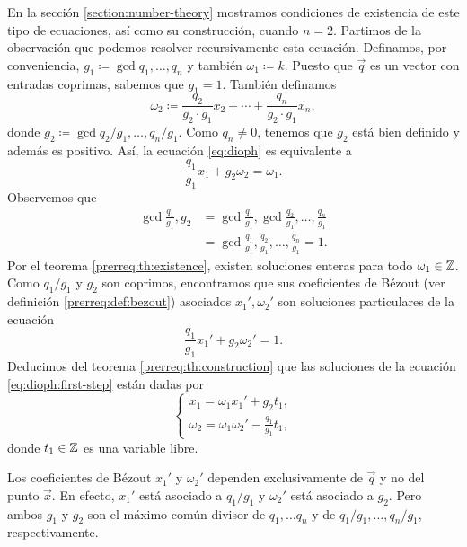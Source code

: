 En la sección \ref{section:number-theory} mostramos condiciones de existencia
de este tipo de ecuaciones, así como su construcción, cuando $n = 2$. Partimos de la
observación que podemos resolver recursivamente esta ecuación. Definamos, por conveniencia, $g_1
\coloneq \gcd{q_1, \ldots, q_n}$ y también $\omega_1 \coloneq k$. Puesto que $\vec{q}$ es un vector
con entradas coprimas, sabemos que $g_1 = 1$. También definamos
\begin{equation}
	\label{def:dummy:omega-2}
	\omega_2 \coloneq \frac{q_2}{g_2 \cdot g_1}x_2 + \cdots + \frac{q_n}{g_2 \cdot
	g_1}x_n,
\end{equation}
donde $g_2 \coloneq \gcd{q_2/g_1, \ldots, q_n/g_1}$. Como $q_n \neq 0$, tenemos que $g_2$ está bien
definido y además es positivo. Así, la ecuación \eqref{eq:dioph} es equivalente a
\begin{equation}
	\label{eq:dioph:first-step}
	\frac{q_1}{g_1}x_1 + g_2\omega_2 = \omega_1.
\end{equation}
Observemos que
\begin{align*}
	\gcd{\frac{q_1}{g_1}, g_2}
	&= \gcd{\frac{q_1}{g_1}, \gcd{\frac{q_2}{g_1}, \ldots, \frac{q_n}{g_1}}} \\
	&= \gcd{\frac{q_1}{g_1}, \frac{q_2}{g_1}, \ldots, \frac{q_n}{g_1}} = 1.
\end{align*}
Por el teorema \ref{prerreq:th:existence}, existen soluciones enteras para todo $\omega_1 \in \mathbb{Z}$.
Como $q_1/g_1$ y $g_2$ son coprimos, encontramos que sus coeficientes de Bézout (ver definición
\ref{prerreq:def:bezout}) asociados $x_1', \omega_2'$ son soluciones particulares de la ecuación
\begin{equation*}
	\frac{q_1}{g_1}x_1' + g_2\omega_2' = 1.
\end{equation*}
Deducimos del teorema \ref{prerreq:th:construction} que las soluciones de la ecuación
\eqref{eq:dioph:first-step} están dadas por
\begin{equation}
	\label{dummy:eq:first-step}
	\begin{cases}
		x_1 = \omega_1x_1' + g_2t_1, \\
		\omega_2 = \omega_1\omega_2' - \frac{q_1}{g_1}t_1,
	\end{cases}
\end{equation}
donde $t_1 \in \mathbb{Z}$ es una variable libre.

\begin{observation}
	Los coeficientes de Bézout $x_1'$ y $\omega_2'$ dependen exclusivamente de $\vec{q}$ y no del
	punto $\vec{x}$. En efecto, $x_1'$ está asociado a $q_1/g_1$ y $\omega_2'$ está asociado a
	$g_2$. Pero ambos $g_1$ y $g_2$ son el máximo común divisor de $q_1, \ldots q_n$ y de
	$q_1/g_1, \ldots, q_n/g_1$, respectivamente. 
\end{observation}

